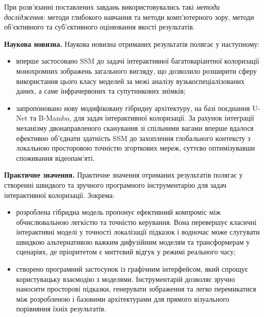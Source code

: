     При розв'язанні поставлених завдань використовувались такі \emph{методи дослідження}:
        методи глибокого навчання та методи комп'ютерного зору,
        методи об'єктивного та суб'єктивного оцінювання якості результатів.

    \textbf{Наукова новизна.}
        Наукова новизна отриманих результатів полягає у наступному:
        \begin{itemize}[label=$\bullet$]
            \item вперше застосовано SSM до задачі інтерактивної багатоваріантної колоризації монохромних зображень загального вигляду,
                що дозволило розширити сферу використання цього класу моделей за межі аналізу вузькоспеціалізованих даних, а саме інфрачервоних та супутникових знімків;
            \item запропоновано нову модифіковану гібридну архітектуру, на базі поєднання U-Net та B-Mamba, для задач інтерактивної колоризації.
                За рахунок інтеграції механізму двонаправленого сканування зі спільними вагами вперше вдалося ефективно об'єднати здатність SSM
                до захоплення глобального контексту з локальною просторовою точністю згорткових мереж, суттєво оптимізувавши споживання відеопам'яті.
        \end{itemize}

    \textbf{Практичне значення.}
        Практичне значення отриманих результатів полягає у створенні швидкого та зручного програмного інструментарію для задач інтерактивної колоризації. Зокрема:
        \begin{itemize}[label=$\bullet$]
            \item розроблена гібридна модель пропонує ефективний компроміс між обчислювальною легкістю та точністю керування. Вона перевершує класичні інтерактивні моделі у точності локалізації підказок і водночас може слугувати швидкою альтернативою важким дифузійним моделям та трансформерам у сценаріях, де пріоритетом є миттєвий відгук у режимі реального часу;
            \item створено програмний застосунок із графічним інтерфейсом, який спрощує користувацьку взаємодію з моделями. Інструментарій дозволяє зручно наносити просторові підказки, генерувати зображення та легко перемикатися між розробленою і базовими архітектурами для прямого візуального порівняння їхніх результатів.
        \end{itemize}

